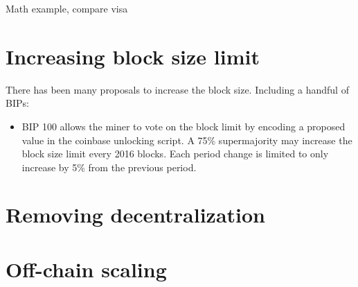 Math example, compare visa 

\section{Increasing block size limit}

There has been many proposals to increase the block size. Including a handful of BIPs:

\begin{itemize}
	
	\item BIP 100 allows the miner to vote on the block limit by encoding a proposed value in the coinbase unlocking script. A 75\% supermajority may increase the block size limit every 2016 blocks. Each period change is limited to only increase by 5\% from the previous period.\cite{bip:0100:dynamic:block:size}
	
\end{itemize}

\section{Removing decentralization}

\section{Off-chain scaling}
